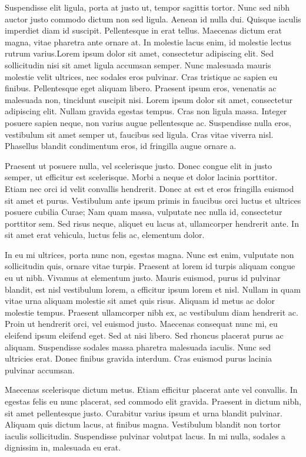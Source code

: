 Suspendisse elit ligula, porta at justo ut, tempor sagittis tortor. Nunc sed nibh auctor justo commodo dictum non sed ligula. Aenean id nulla dui. Quisque iaculis imperdiet diam id suscipit. Pellentesque in erat tellus. Maecenas dictum erat magna, vitae pharetra ante ornare at. In molestie lacus enim, id molestie lectus rutrum varius.Lorem ipsum dolor sit amet, consectetur adipiscing elit. Sed sollicitudin nisi sit amet ligula accumsan semper. Nunc malesuada mauris molestie velit ultrices, nec sodales eros pulvinar. Cras tristique ac sapien eu finibus. Pellentesque eget aliquam libero. Praesent ipsum eros, venenatis ac malesuada non, tincidunt suscipit nisi. Lorem ipsum dolor sit amet, consectetur adipiscing elit. Nullam gravida egestas tempus. Cras non ligula massa. Integer posuere sapien neque, non varius augue pellentesque ac. Suspendisse nulla eros, vestibulum sit amet semper ut, faucibus sed ligula. Cras vitae viverra nisl. Phasellus blandit condimentum eros, id fringilla augue ornare a.

Praesent ut posuere nulla, vel scelerisque justo. Donec congue elit in justo semper, ut efficitur est scelerisque. Morbi a neque et dolor lacinia porttitor. Etiam nec orci id velit convallis hendrerit. Donec at est et eros fringilla euismod sit amet et purus. Vestibulum ante ipsum primis in faucibus orci luctus et ultrices posuere cubilia Curae; Nam quam massa, vulputate nec nulla id, consectetur porttitor sem. Sed risus neque, aliquet eu lacus at, ullamcorper hendrerit ante. In sit amet erat vehicula, luctus felis ac, elementum dolor.

In eu mi ultrices, porta nunc non, egestas magna. Nunc est enim, vulputate non sollicitudin quis, ornare vitae turpis. Praesent at lorem id turpis aliquam congue eu ut nibh. Vivamus at elementum justo. Mauris euismod, purus id pulvinar blandit, est nisl vestibulum lorem, a efficitur ipsum lorem et nisl. Nullam in quam vitae urna aliquam molestie sit amet quis risus. Aliquam id metus ac dolor molestie tempus. Praesent ullamcorper nibh ex, ac vestibulum diam hendrerit ac. Proin ut hendrerit orci, vel euismod justo. Maecenas consequat nunc mi, eu eleifend ipsum eleifend eget. Sed at nisi libero. Sed rhoncus placerat purus ac aliquam. Suspendisse sodales massa pharetra malesuada iaculis. Nunc sed ultricies erat. Donec finibus gravida interdum. Cras euismod purus lacinia pulvinar accumsan.

Maecenas scelerisque dictum metus. Etiam efficitur placerat ante vel convallis. In egestas felis eu nunc placerat, sed commodo elit gravida. Praesent in dictum nibh, sit amet pellentesque justo. Curabitur varius ipsum et urna blandit pulvinar. Aliquam quis dictum lacus, at finibus magna. Vestibulum blandit non tortor iaculis sollicitudin. Suspendisse pulvinar volutpat lacus. In mi nulla, sodales a dignissim in, malesuada eu erat.

